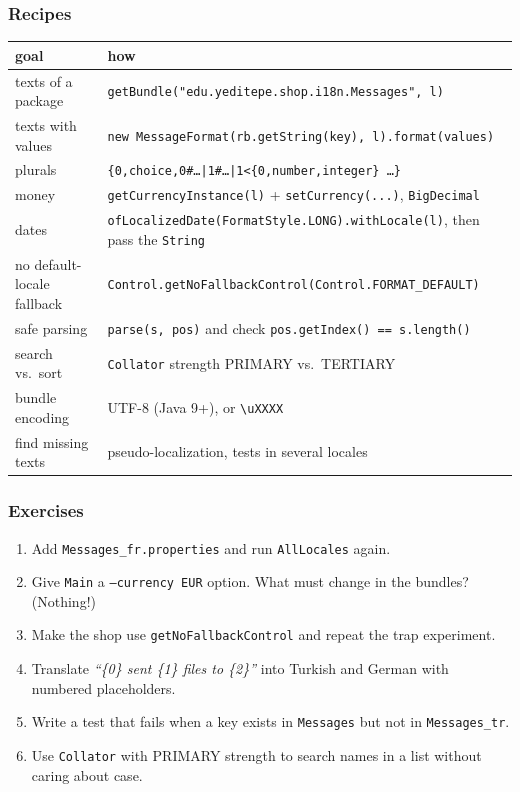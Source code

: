 \documentclass[aspectratio=169,10pt,compress]{beamer}
\begin{document}
\begin{frame}[t,fragile] \frametitle{Recipes}
  \begin{center}\scriptsize
  \begin{tabular}{L{0.3\textwidth}L{0.62\textwidth}}
    \toprule
    \textbf{goal} & \textbf{how} \\
    \midrule
    texts of a package     & \texttt{getBundle("edu.yeditepe.shop.i18n.Messages", l)} \\
    texts with values      & \texttt{new MessageFormat(rb.getString(key), l).format(values)} \\
    plurals                & \texttt{\{0,choice,0\#\dots|1\#\dots|1<\{0,number,integer\} \dots\}} \\
    money                  & \texttt{getCurrencyInstance(l)} + \texttt{setCurrency(...)}, \texttt{BigDecimal} \\
    dates                  & \texttt{ofLocalizedDate(FormatStyle.LONG).withLocale(l)}, then pass the \texttt{String} \\
    no default-locale fallback & \texttt{Control.getNoFallbackControl(Control.FORMAT\_DEFAULT)} \\
    safe parsing           & \texttt{parse(s, pos)} and check \texttt{pos.getIndex() == s.length()} \\
    search vs.\ sort       & \texttt{Collator} strength PRIMARY vs.\ TERTIARY \\
    bundle encoding        & UTF-8 (Java 9+), or \texttt{\textbackslash uXXXX} \\
    find missing texts     & pseudo-localization, tests in several locales \\
    \bottomrule
  \end{tabular}
  \end{center}
\end{frame}




\begin{frame}[t,fragile] \frametitle{Exercises}
  \begin{enumerate}\small
    \item Add \texttt{Messages\_fr.properties} and run \texttt{AllLocales} again.
    \item Give \texttt{Main} a \texttt{--currency EUR} option. What must change in the bundles? (Nothing!)
    \item Make the shop use \texttt{getNoFallbackControl} and repeat the trap experiment.
    \item Translate \emph{``\{0\} sent \{1\} files to \{2\}''} into Turkish and German with numbered placeholders.
    \item Write a test that fails when a key exists in \texttt{Messages} but not in \texttt{Messages\_tr}.
    \item Use \texttt{Collator} with PRIMARY strength to search names in a list without caring about case.
  \end{enumerate}
\end{frame}
\end{document}
